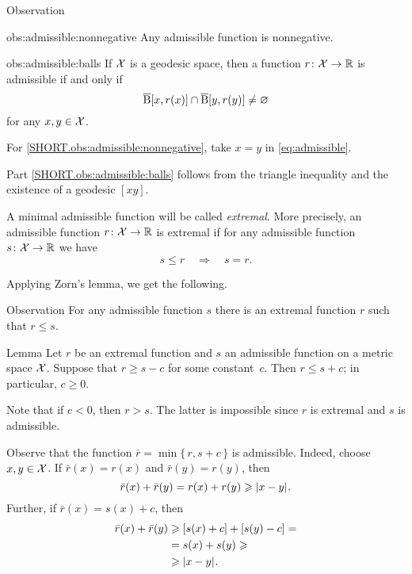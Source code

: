 \begin{thm}{Observation}\label{obs:admissible}

\begin{subthm}{obs:admissible:nonnegative}
Any admissible function is nonnegative.
\end{subthm}

\begin{subthm}{obs:admissible:balls}
If $\mathcal{X}$ is a geodesic space, then a function $r\colon\mathcal{X}\to\mathbb{R}$ is admissible if and only if 
\[\overline{\mathrm{B}}{}[x,r(x)]\cap\overline{\mathrm{B}}{}[y,r(y)]\ne \varnothing\]
for any $x,y\in \mathcal{X}$.
\end{subthm}
 
\end{thm}

 For \ref{SHORT.obs:admissible:nonnegative}, take $x=y$ in \ref{eq:admissible}.

Part \ref{SHORT.obs:admissible:balls} follows from the triangle inequality and the existence of a geodesic $[xy]$.
\qeds

A minimal admissible function will be called \label{page:extremal function}\emph{extremal}.
More precisely, an admissible function $r\colon\mathcal{X}\to\mathbb{R}$ is extremal 
if for any admissible function $s\colon\mathcal{X}\to\mathbb{R}$ we have
\[s\le r\quad\Longrightarrow\quad s=r.\]

Applying Zorn's lemma, we get the following.

\begin{thm}{Observation}\label{obs:extremal:below}
For any admissible function $s$ there is an extremal function $r$ such that $r\le s$.
\end{thm}

\begin{thm}{Lemma}\label{lem:+-c}
Let $r$ be an extremal function and $s$ an admissible function on a metric space $\mathcal{X}$.
Suppose that $r\ge s-c$ for some constant~$c$.
Then $r\le s+c$; in particular, $c\ge 0$.
\end{thm}

Note that if $c<0$, then $r>s$.
The latter is impossible since $r$ is extremal and $s$ is admissible.

Observe that the function $\bar r=\min\{\,r,s+c\,\}$ is admissible.
Indeed, choose $x,y\in \mathcal{X}$.
If $\bar r(x)=r(x)$ and $\bar r(y)=r(y)$, then 
\[\bar r(x)+\bar r(y)=r(x)+ r(y)\ge \dist{x}{y}{}.\]
Further, if $\bar r(x)=s(x)+c$, then 
\begin{align*}
\bar r(x)+\bar r(y)&\ge [s(x)+c]+ [s(y)-c]= 
\\
&=s(x)+s(y) \ge 
\\
&\ge\dist{x}{y}{}.
\end{align*}

